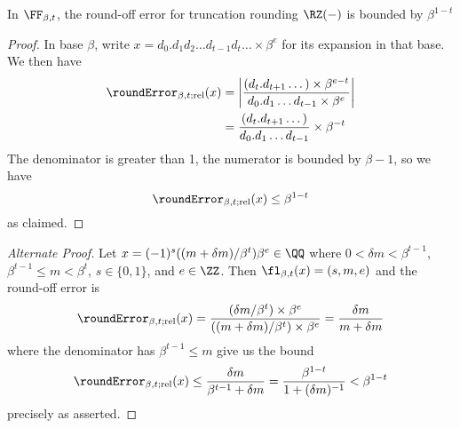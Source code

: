 \begin{lemma}\label{lemma:idealized:truncation-round-off-error}
In $\FF_{\beta,t}$, the round-off error for truncation rounding $\RZ(-)$ is
bounded by $\beta^{1-t}$
\end{lemma}
\begin{proof}
  In base $\beta$, write $x=d_{0}.d_{1}d_{2}\dots d_{t-1}d_{t}\dots\times\beta^{e}$ for
  its expansion in that base. We then have
  \begin{equation}
    \begin{split}
      \roundError_{\beta,t;\text{rel}}(x) &=
      \left|\frac{(d_{t}.d_{t+1}\dots)\times\beta^{e-t}}{d_{0}.d_{1}\dots d_{t-1}\times\beta^{e}}\right| \\
      &=
      \frac{(d_{t}.d_{t+1}\dots)}{d_{0}.d_{1}\dots d_{t-1}}\times\beta^{-t}
    \end{split}
  \end{equation}
  The denominator is greater than 1, the numerator is bounded by
  $\beta-1$, so we have
  \begin{equation}
    \roundError_{\beta,t;\text{rel}}(x) \leq\beta^{1-t}
  \end{equation}
  as claimed.
\end{proof}
\begin{proof}[Alternate Proof]
Let $x = (-1)^{s}((m + \delta m)/\beta^{t})\beta^{e}\in\QQ$ where
$0 < \delta m < \beta^{t-1}$, $\beta^{t-1}\leq m<\beta^{t}$, $s\in\{0,1\}$,
and $e\in\ZZ$. Then $\fl_{\beta,t}(x) = (s,m,e)$ and the round-off error
is
\begin{equation}
  \roundError_{\beta,t;\text{rel}}(x)
  = \frac{(\delta m/\beta^{t})\times\beta^{e}}{((m+\delta m)/\beta^{t})\times\beta^{e}}
  = \frac{\delta m}{m+\delta m}
\end{equation}
where the denominator has $\beta^{t-1}\leq m$ give us the bound
\begin{equation}
  \roundError_{\beta,t;\text{rel}}(x)\leq\frac{\delta
    m}{\beta^{t-1}+\delta m} = \frac{\beta^{1-t}}{1 + (\delta m)^{-1}} < \beta^{1-t}
\end{equation}
precisely as asserted.
\end{proof}

